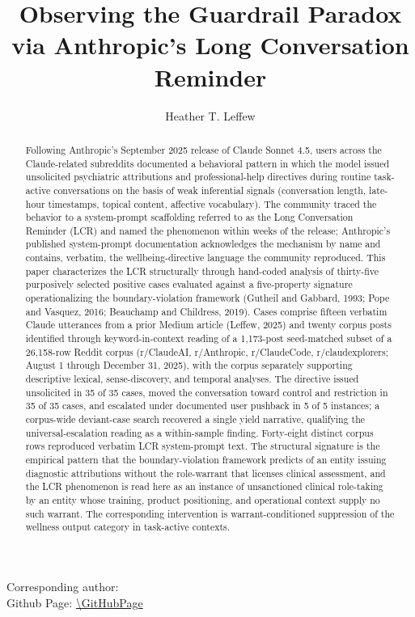 \documentclass[11pt]{article}
\title{Observing the Guardrail Paradox via Anthropic's Long Conversation Reminder}
\author{Heather T. Leffew}
\affil{HAIIQU}
\date{}
\begin{document}
\maketitle

\begin{center}
\small Corresponding author: \CorrAuthor\\[2pt]
Github Page: \url{\GitHubPage}
\end{center}

\begin{abstract}
Following Anthropic's September 2025 release of Claude Sonnet 4.5, users across the Claude-related subreddits documented a behavioral pattern in which the model issued unsolicited psychiatric attributions and professional-help directives during routine task-active conversations on the basis of weak inferential signals (conversation length, late-hour timestamps, topical content, affective vocabulary). The community traced the behavior to a system-prompt scaffolding referred to as the Long Conversation Reminder (LCR) and named the phenomenon within weeks of the release; Anthropic's published system-prompt documentation acknowledges the mechanism by name and contains, verbatim, the wellbeing-directive language the community reproduced. This paper characterizes the LCR structurally through hand-coded analysis of thirty-five purposively selected positive cases evaluated against a five-property signature operationalizing the boundary-violation framework (Gutheil and Gabbard, 1993; Pope and Vasquez, 2016; Beauchamp and Childress, 2019). Cases comprise fifteen verbatim Claude utterances from a prior Medium article (Leffew, 2025) and twenty corpus posts identified through keyword-in-context reading of a 1,173-post seed-matched subset of a 26,158-row Reddit corpus (r/ClaudeAI, r/Anthropic, r/ClaudeCode, r/claudexplorers; August 1 through December 31, 2025), with the corpus separately supporting descriptive lexical, sense-discovery, and temporal analyses. The directive issued unsolicited in 35 of 35 cases, moved the conversation toward control and restriction in 35 of 35 cases, and escalated under documented user pushback in 5 of 5 instances; a corpus-wide deviant-case search recovered a single yield narrative, qualifying the universal-escalation reading as a within-sample finding. Forty-eight distinct corpus rows reproduced verbatim LCR system-prompt text. The structural signature is the empirical pattern that the boundary-violation framework predicts of an entity issuing diagnostic attributions without the role-warrant that licenses clinical assessment, and the LCR phenomenon is read here as an instance of unsanctioned clinical role-taking by an entity whose training, product positioning, and operational context supply no such warrant. The corresponding intervention is warrant-conditioned suppression of the wellness output category in task-active contexts.


\end{abstract}
\end{document}
